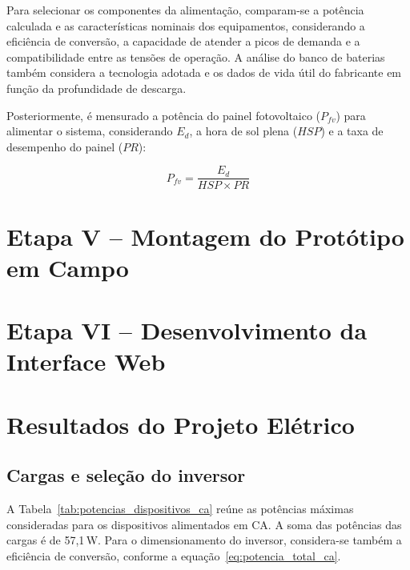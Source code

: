 Para selecionar os componentes da alimentação, comparam-se a potência calculada e as características nominais dos equipamentos, considerando a eficiência de conversão, a capacidade de atender a picos de demanda e a compatibilidade entre as tensões de operação. A análise do banco de baterias também considera a tecnologia adotada e os dados de vida útil do fabricante em função da profundidade de descarga.

Posteriormente, é mensurado a potência do painel fotovoltaico ($P_{fv}$) para alimentar o sistema, considerando $E_{d}$, a hora de sol plena ($HSP$) e a taxa de desempenho do painel ($PR$):

\begin{equation}
  P_{fv} = \frac{E_{d}}{HSP \times PR}
  \label{eq:potencia_painel}
\end{equation}

\section{Etapa V -- Montagem do Protótipo em Campo}
\label{sec:etapa_v}


\section{Etapa VI -- Desenvolvimento da Interface Web}
\label{sec:etapa_vi}


\section{Resultados do Projeto Elétrico}
\label{sec:resultados_projeto_eletrico}

\subsection{Cargas e seleção do inversor}
\label{subsec:resultados_cargas_inversor}

A Tabela~\ref{tab:potencias_dispositivos_ca} reúne as potências máximas consideradas para os dispositivos alimentados em CA. A soma das potências das cargas é de 57,1\,W. Para o dimensionamento do inversor, considera-se também a eficiência de conversão, conforme a equação~\eqref{eq:potencia_total_ca}.

